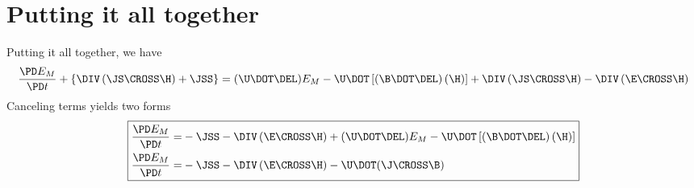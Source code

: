 \documentclass[11pt]{article}
\begin{document}
\section{Putting it all together}
Putting it all together, we have
\begin{equation}
	\frac{\PD E_M}{\PD t} +
	\left\{ \DIV \left(\JS \CROSS \H \right) + \JSS \right\} =
	(\U \DOT \DEL) E_M
	- \U \DOT \left[(\B \DOT \DEL) \left( \H \right) \right]
	+ \DIV \left(\JS \CROSS \H \right)
	- \DIV \left(\E \CROSS \H \right)
\end{equation}
Canceling terms yields two forms
\begin{equation}\boxed{\begin{aligned}
	\frac{\PD E_M}{\PD t} = &
	- \JSS
	- \DIV \left(\E \CROSS \H \right)
	+ (\U \DOT \DEL) E_M
	- \U \DOT \left[(\B \DOT \DEL) \left( \H \right) \right]  \\
	\frac{\PD E_M}{\PD t} = &
	- \JSS
	- \DIV \left(\E \CROSS \H \right)
	- \U \DOT (\J \CROSS \B)
\end{aligned}}\end{equation}
\end{document}
